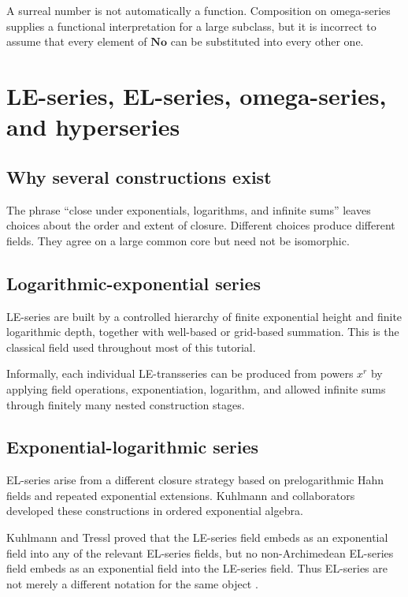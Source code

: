 \documentclass[11pt,openany]{book}
\theoremstyle{plain}
\theoremstyle{definition}
\theoremstyle{remark}
\begin{document}
\begin{warningbox}
A surreal number is not automatically a function. Composition on omega-series supplies a functional interpretation for a large subclass, but it is incorrect to assume that every element of $\mathbf{No}$ can be substituted into every other one.
\end{warningbox}

\chapter{LE-series, EL-series, omega-series, and hyperseries}
\label{chap:variants}

\section{Why several constructions exist}
The phrase ``close under exponentials, logarithms, and infinite sums'' leaves choices about the order and extent of closure. Different choices produce different fields. They agree on a large common core but need not be isomorphic.

\section{Logarithmic-exponential series}
LE-series are built by a controlled hierarchy of finite exponential height and finite logarithmic depth, together with well-based or grid-based summation. This is the classical field used throughout most of this tutorial.

Informally, each individual LE-transseries can be produced from powers $x^r$ by applying field operations, exponentiation, logarithm, and allowed infinite sums through finitely many nested construction stages.

\section{Exponential-logarithmic series}
EL-series arise from a different closure strategy based on prelogarithmic Hahn fields and repeated exponential extensions. Kuhlmann and collaborators developed these constructions in ordered exponential algebra.

Kuhlmann and Tressl proved that the LE-series field embeds as an exponential field into any of the relevant EL-series fields, but no non-Archimedean EL-series field embeds as an exponential field into the LE-series field. Thus EL-series are not merely a different notation for the same object \cite{KuhlmannTressl2011}.
\end{document}
